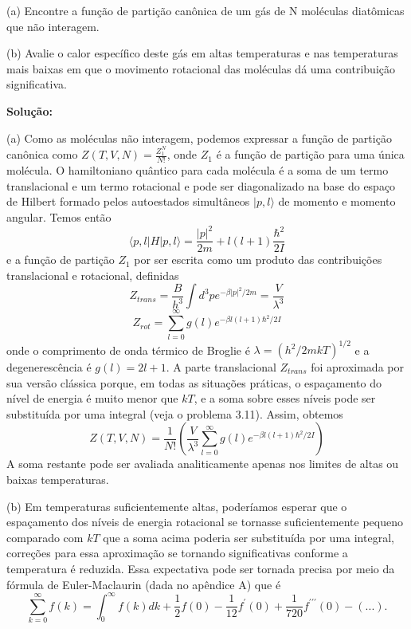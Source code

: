 \documentclass[12pt]{article}
\begin{document}
(a) Encontre a função de partição canônica de um gás de N moléculas diatômicas que não interagem.

(b) Avalie o calor específico deste gás em altas temperaturas e nas temperaturas mais baixas em que o movimento rotacional das moléculas dá uma contribuição significativa.

 \textbf{Solução:}
 
(a) Como as moléculas não interagem, podemos expressar a função de partição canônica como $Z(T, V, N) = \frac{Z^{N}_{1}}{N!}$, onde $Z_{1}$ é a função de partição para uma única molécula. O hamiltoniano quântico para cada molécula é a soma de um termo translacional e um termo rotacional e pode ser diagonalizado na base do espaço de Hilbert formado pelos autoestados simultâneos $|p, l\rangle$ de momento e momento angular. Temos então
\begin{equation}
\langle p,l| H |p,l\rangle = \frac{|p|^{2}}{2m} + l(l+1)\frac{\hbar^{2}}{2I}
\end{equation}
e a função de partição $Z_{1}$ por ser escrita como um produto das contribuições translacional e rotacional, definidas
\begin{equation}
    Z_{trans} = \frac{B}{h^{3}} \int d^{3} p e^{- \beta |p|^{2}/2m} = \frac{V}{\lambda^{3}}
\end{equation}
\begin{equation}
Z_{rot} = \sum^{\infty}_{l=0} g(l)e^{- \beta l(l+1)\hbar^{2}/2I}
\end{equation}
onde o comprimento de onda térmico de Broglie é $\lambda = (h^{2}/2mkT)^{1/2}$ e a degenerescência é $ g(l) = 2l + 1$. A parte translacional $Z_{trans}$ foi aproximada por sua versão clássica porque, em todas as situações práticas, o espaçamento do nível de energia é muito menor que $kT$, e a soma sobre esses níveis pode ser substituída por uma integral (veja o problema 3.11). Assim, obtemos
\begin{equation}
Z(T, V, N) = \frac{1}{N!} \left(\frac{V}{\lambda^{3}}\sum^{\infty}_{l=0}g(l)e^{- \beta l(l+1)\hbar^{2}/2I}\right)
\end{equation}
A soma restante pode ser avaliada analiticamente apenas nos limites de altas ou baixas temperaturas.

(b) Em temperaturas suficientemente altas, poderíamos esperar que o espaçamento dos níveis de energia rotacional se tornasse suficientemente pequeno comparado com $kT$ que a soma acima poderia ser substituída por uma integral, correções para essa aproximação se tornando significativas conforme a temperatura é reduzida. Essa expectativa pode ser tornada precisa por meio da fórmula de Euler-Maclaurin (dada no apêndice A) que é
\begin{equation}
\sum^{\infty}_{k=0} f(k) = \int^{\infty}_{0} f(k)dk + \frac{1}{2}f(0) - \frac{1}{12}f^{\prime}(0) + \frac{1}{720}f^{\prime \prime \prime}(0) - (...).
\end{equation}
\end{document}

